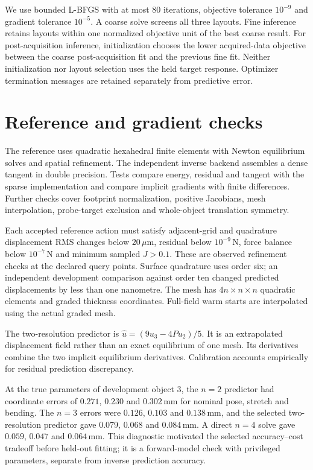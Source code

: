 \documentclass[10pt,twocolumn,letterpaper]{article}
\begin{document}
We use bounded L-BFGS with at most 80 iterations, objective tolerance $10^{-9}$ and gradient tolerance $10^{-5}$. A coarse solve screens all three layouts. Fine inference retains layouts within one normalized objective unit of the best coarse result. For post-acquisition inference, initialization chooses the lower acquired-data objective between the coarse post-acquisition fit and the previous fine fit. Neither initialization nor layout selection uses the held target response. Optimizer termination messages are retained separately from predictive error.

\section{Reference and gradient checks}
The reference uses quadratic hexahedral finite elements with Newton equilibrium solves and spatial refinement. The independent inverse backend assembles a dense tangent in double precision. Tests compare energy, residual and tangent with the sparse implementation and compare implicit gradients with finite differences. Further checks cover footprint normalization, positive Jacobians, mesh interpolation, probe-target exclusion and whole-object translation symmetry.

Each accepted reference action must satisfy adjacent-grid and quadrature displacement RMS changes below $20\,\mu$m, residual below $10^{-9}$\,N, force balance below $10^{-7}$\,N and minimum sampled $J>0.1$. These are observed refinement checks at the declared query points. Surface quadrature uses order six; an independent development comparison against order ten changed predicted displacements by less than one nanometre. The mesh has $4n\times n\times n$ quadratic elements and graded thickness coordinates. Full-field warm starts are interpolated using the actual graded mesh.

The two-resolution predictor is $\hat u=(9u_3-4Pu_2)/5$. It is an extrapolated displacement field rather than an exact equilibrium of one mesh. Its derivatives combine the two implicit equilibrium derivatives. Calibration accounts empirically for residual prediction discrepancy.

At the true parameters of development object 3, the $n=2$ predictor had coordinate errors of $0.271$, $0.230$ and $0.302$\,mm for nominal pose, stretch and bending. The $n=3$ errors were $0.126$, $0.103$ and $0.138$\,mm, and the selected two-resolution predictor gave $0.079$, $0.068$ and $0.084$\,mm. A direct $n=4$ solve gave $0.059$, $0.047$ and $0.064$\,mm. This diagnostic motivated the selected accuracy--cost tradeoff before held-out fitting; it is a forward-model check with privileged parameters, separate from inverse prediction accuracy.
\end{document}
